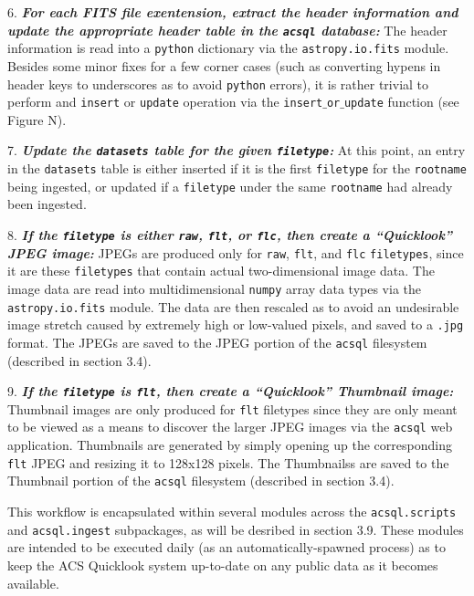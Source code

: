 \documentclass[10pt,journal,compsoc]{IEEEtran}
\begin{document}
6. \textbf{\textit{For each FITS file exentension, extract the header information and update
the appropriate header table in the \texttt{acsql} database:}}  The header information
is read into a \texttt{python} dictionary via the \texttt{astropy.io.fits} module.
Besides some minor fixes for a few corner cases (such as converting hypens in header keys
to underscores as to avoid \texttt{python} errors), it is rather trivial to perform
and \texttt{insert} or \texttt{update} operation via the \texttt{insert$\_$or$\_$update}
function (see Figure N).

7. \textbf{\textit{Update the \texttt{datasets} table for the given \texttt{filetype}:}}
At this point, an entry in the \texttt{datasets} table is either inserted if it is the
first \texttt{filetype} for the \texttt{rootname} being ingested, or updated if a
\texttt{filetype} under the same \texttt{rootname} had already been ingested.

8. \textbf{\textit{If the \texttt{filetype} is either \texttt{raw}, \texttt{flt}, or
\texttt{flc}, then create a ``Quicklook'' JPEG image:}}  JPEGs are produced only for
\texttt{raw}, \texttt{flt}, and \texttt{flc} \texttt{filetypes}, since it are these
\texttt{filetypes} that contain actual two-dimensional image data.  The image data are
read into multidimensional \texttt{numpy} array data types via the
\texttt{astropy.io.fits} module.  The data are then rescaled as to avoid an undesirable
image stretch caused by extremely high or low-valued pixels, and saved to a \texttt{.jpg}
format.  The JPEGs are saved to the JPEG portion of the \texttt{acsql} filesystem
(described in section 3.4).

9. \textbf{\textit{If the \texttt{filetype} is \texttt{flt}, then create a ``Quicklook''
Thumbnail image:}} Thumbnail images are only produced for \texttt{flt} filetypes since they
are only meant to be viewed as a means to discover the larger JPEG images via the
\texttt{acsql} web application.  Thumbnails are generated by simply opening up the
corresponding \texttt{flt} JPEG and resizing it to 128x128 pixels.  The Thumbnailss are saved
to the Thumbnail portion of the \texttt{acsql} filesystem (described in section 3.4).

This workflow is encapsulated within several modules across the \texttt{acsql.scripts} and
\texttt{acsql.ingest} subpackages, as will be desribed in section 3.9.  These modules are
intended to be executed daily (as an automatically-spawned process) as to keep the ACS
Quicklook system up-to-date on any public data as it becomes available.
\end{document}
